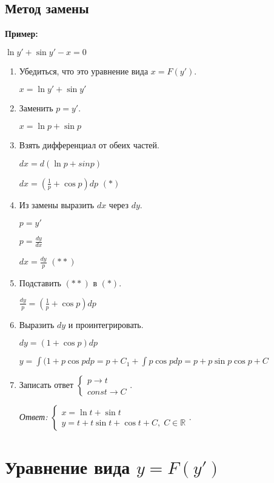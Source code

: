 \documentclass[10pt, a4paper]{article}
\begin{document}
\subsection{Метод замены}
\textbf{Пример:}
\par $\ln{y'} + \sin{y'} - x = 0$
\begin{enumerate}
    \item Убедиться, что это уравнение вида $x = F(y')$.
        \par $x = \ln{y'} + \sin{y'}$
    \item Заменить $p = y'$.
        \par $x = \ln{p} + \sin{p}$
    \item Взять дифференциал от обеих частей.
        \par $dx = d(\ln{p} + sin{p})$
        \par $dx = (\frac{1}{p} + \cos{p})dp$ $(*)$
    \item Из замены выразить $dx$ через $dy$.
        \par $p = y'$
        \par $p = \frac{dy}{dx}$
        \par $dx = \frac{dy}{p}$ $(**)$
    \item Подставить $(**)$ в $(*)$.
        \par $\frac{dy}{p} = (\frac{1}{p} + \cos{p})dp$
    \item Выразить $dy$ и проинтегрировать.
        \par $dy = (1 + \cos{p})dp$
        \par $y = \int{(1 + p\cos{p}dp} = p + C_1 + \int{p\cos{p}dp} = p + p\sin{p} \cos{p} + C$
    \item Записать ответ
        $\begin{cases}
            p \rightarrow t \\
            const \rightarrow C
        \end{cases}$.
        \par\textit{Ответ:}
            $\begin{cases}
                x = \ln{t} + \sin{t} \\
                y = t + t\sin{t} + \cos{t} + C, \; C \in \mathbb{R}
            \end{cases}$.
\end{enumerate}

\section{Уравнение вида $y = F(y')$}
\end{document}
